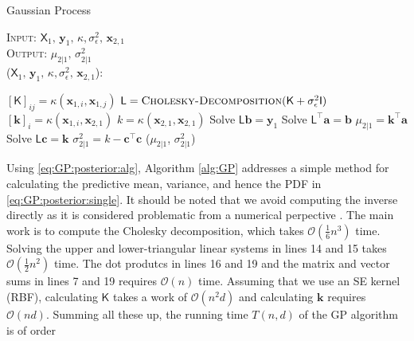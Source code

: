 \documentclass[10pt]{article}
\theoremstyle{definition}
\begin{document}
\begin{algorithm}[t!]
\caption{Gaussian Process}\label{alg:GP}
\hspace*{\algorithmicindent} {\scshape Input}: $\mathsf{X}_1, \, \mathbf{y}_1, \, \kappa, \sigma_{\epsilon}^2, \, \mathbf{x}_{2,1}$ \\
\hspace*{\algorithmicindent} {\scshape Output}: $\mu_{2|1}, \, \sigma_{2|1}^2$ \\
\hspace*{\algorithmicindent}{\scshape Gaussian-Process}($\mathsf{X}_1, \, \mathbf{y}_1, \, \kappa, \sigma_{\epsilon}^2, \, \mathbf{x}_{2,1}$):
\begin{algorithmic}[1]
        \State $[\mathsf{K}]_{ij} = \kappa(\mathbf{x}_{1,i}, \mathbf{x}_{1,j})$
    \EndFor
\EndFor
\State $\mathsf{L}= \text{{\scshape Cholesky-Decomposition}}(\mathsf{K}+\sigma_{\epsilon}^2\mathsf{I})$
    \State $[\mathbf{k}]_{i} = \kappa(\mathbf{x}_{1,i}, \mathbf{x}_{2,1})$
\EndFor
\State $k = \kappa(\mathbf{x}_{2,1}, \mathbf{x}_{2,1})$
\State Solve $\mathsf{L} \mathbf{b} = \mathbf{y}_1$
\State Solve $\mathsf{L}^{\top} \mathbf{a} = \mathbf{b}$
\State $\mu_{2|1} = \mathbf{k}^{\top}\mathbf{a}$
\State Solve $\mathsf{L} \mathbf{c} = \mathbf{k}$
\State $\sigma_{2|1}^2=k-\mathbf{c}^{\top}\mathbf{c}$
\State \Return ($\mu_{2|1}$, $\sigma_{2|1}^2$)
\end{algorithmic}
\end{algorithm}
Using \cref{eq:GP:posterior:alg}, Algorithm \ref{alg:GP} addresses a simple method for calculating the predictive mean, variance, and hence the PDF in \eqref{eq:GP:posterior:single}.  It should be noted that we avoid computing the inverse directly as it is considered problematic from a numerical perpective \cite[Section 4.7]{Gill1991}. The main work is to compute the Cholesky decomposition, which takes $\mathcal{O}(\frac{1}{6}n^3)$ time. Solving the upper and lower-triangular linear systems in lines 14 and 15 takes $\mathcal{O}(\frac{1}{2}n^2)$ time. The dot produtcs in lines 16 and 19  and the matrix and vector sums in lines 7 and 19 requires $\mathcal{O}(n)$ time. Assuming that we use an SE kernel (RBF), calculating $\mathsf{K}$ takes a work of $\mathcal{O}(n^2d)$ and calculating $\mathbf{k}$ requires $\mathcal{O}(nd)$. Summing all these up, the running time $T(n,d)$ of the GP algorithm is of order
\end{document}
